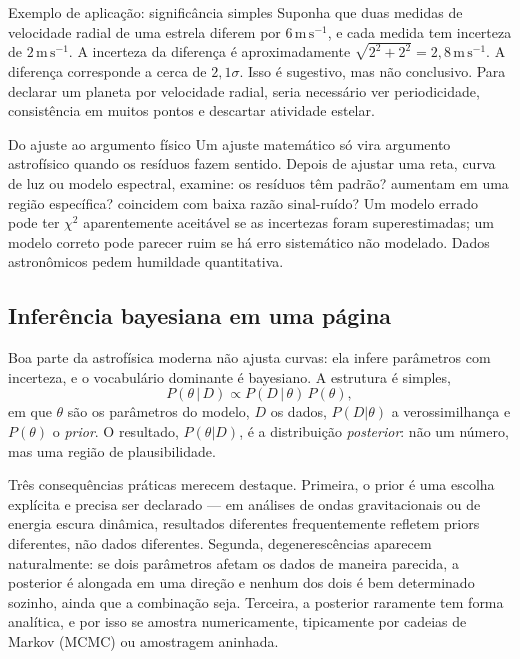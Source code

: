 \documentclass[11pt,a4paper]{article}
\begin{document}
\begin{lessonblock}{Exemplo de aplicação: significância simples}
Suponha que duas medidas de velocidade radial de uma estrela diferem por $6\,\mathrm{m\,s^{-1}}$, e cada medida tem incerteza de $2\,\mathrm{m\,s^{-1}}$. A incerteza da diferença é aproximadamente $\sqrt{2^2+2^2}=2{,}8\,\mathrm{m\,s^{-1}}$. A diferença corresponde a cerca de $2{,}1\sigma$. Isso é sugestivo, mas não conclusivo. Para declarar um planeta por velocidade radial, seria necessário ver periodicidade, consistência em muitos pontos e descartar atividade estelar.
\end{lessonblock}

\begin{lessonblock}{Do ajuste ao argumento físico}
Um ajuste matemático só vira argumento astrofísico quando os resíduos fazem sentido. Depois de ajustar uma reta, curva de luz ou modelo espectral, examine: os resíduos têm padrão? aumentam em uma região específica? coincidem com baixa razão sinal-ruído? Um modelo errado pode ter $\chi^2$ aparentemente aceitável se as incertezas foram superestimadas; um modelo correto pode parecer ruim se há erro sistemático não modelado. Dados astronômicos pedem humildade quantitativa.
\end{lessonblock}
\subsection*{Inferência bayesiana em uma página}

Boa parte da astrofísica moderna não ajusta curvas: ela infere parâmetros com incerteza, e o vocabulário dominante é bayesiano. A estrutura é simples,
\[
P(\theta\,|\,D)\propto P(D\,|\,\theta)\,P(\theta),
\]
em que $\theta$ são os parâmetros do modelo, $D$ os dados, $P(D|\theta)$ a verossimilhança e $P(\theta)$ o \textit{prior}. O resultado, $P(\theta|D)$, é a distribuição \textit{posterior}: não um número, mas uma região de plausibilidade.

Três consequências práticas merecem destaque. Primeira, o prior é uma escolha explícita e precisa ser declarado --- em análises de ondas gravitacionais ou de energia escura dinâmica, resultados diferentes frequentemente refletem priors diferentes, não dados diferentes. Segunda, degenerescências aparecem naturalmente: se dois parâmetros afetam os dados de maneira parecida, a posterior é alongada em uma direção e nenhum dos dois é bem determinado sozinho, ainda que a combinação seja. Terceira, a posterior raramente tem forma analítica, e por isso se amostra numericamente, tipicamente por cadeias de Markov (MCMC) ou amostragem aninhada.
\end{document}
